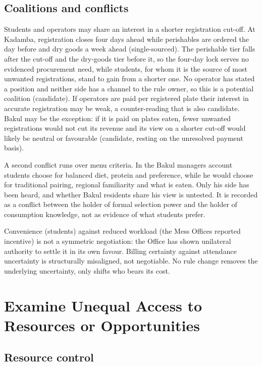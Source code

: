 \documentclass[
  10pt,
  table]{article}
\begin{document}
\subsection{Coalitions and conflicts}\label{coalitions-and-conflicts}

Students and operators may share an interest in a shorter registration cut-off. At Kadamba, registration closes four days ahead while perishables are ordered the day before and dry goods a week ahead (single-sourced). The perishable tier falls after the cut-off and the dry-goods tier before it, so the four-day lock serves no evidenced procurement need, while students, for whom it is the source of most unwanted registrations, stand to gain from a shorter one. No operator has stated a position and neither side has a channel to the rule owner, so this is a potential coalition (candidate). If operators are paid per registered plate their interest in accurate registration may be weak, a counter-reading that is also candidate. Bakul may be the exception: if it is paid on plates eaten, fewer unwanted registrations would not cut its revenue and its view on a shorter cut-off would likely be neutral or favourable (candidate, resting on the unresolved payment basis).

A second conflict runs over menu criteria. In the Bakul manager\textquotesingle s account students choose for balanced diet, protein and preference, while he would choose for traditional pairing, regional familiarity and what is eaten. Only his side has been heard, and whether Bakul residents share his view is untested. It is recorded as a conflict between the holder of formal selection power and the holder of consumption knowledge, not as evidence of what students prefer.

Convenience (students) against reduced workload (the Mess Office\textquotesingle s reported incentive) is not a symmetric negotiation: the Office has shown unilateral authority to settle it in its own favour. Billing certainty against attendance uncertainty is structurally misaligned, not negotiable. No rule change removes the underlying uncertainty, only shifts who bears its cost.

\section{Examine Unequal Access to Resources or Opportunities}\label{examine-unequal-access-to-resources-or-opportunities}

\subsection{Resource control}\label{resource-control}
\end{document}
